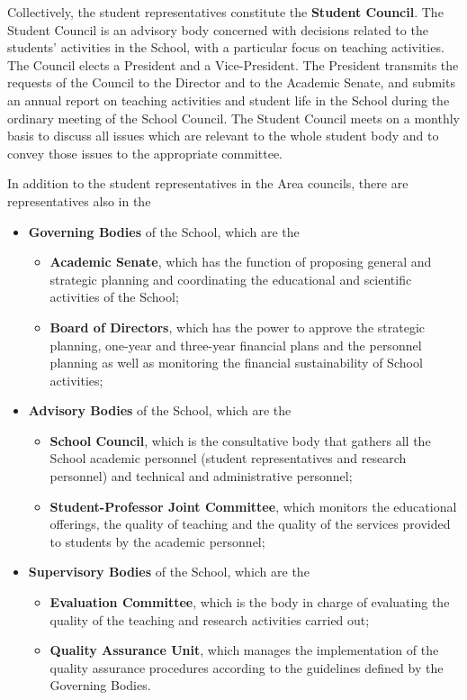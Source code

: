 \documentclass{sissavademecum}
\begin{document}
Collectively, the student representatives constitute the \textbf{Student Council}. The Student Council is an advisory body concerned with decisions related to the students' activities in the School, with a particular focus on teaching activities. The Council elects a President and a Vice-President. The President transmits the requests of the Council to the Director and to the Academic Senate, and submits an annual report on teaching activities and student life in the School during the ordinary meeting of the School Council. The Student Council meets on a monthly basis to discuss all issues which are relevant to the whole student body and to convey those issues to the appropriate committee.

In addition to the student representatives in the Area councils, there are representatives also in the
\begin{itemize}
    \item \textbf{Governing Bodies} of the School, which are the
    \begin{itemize}
        \item \textbf{Academic Senate}, which has the function of proposing general and strategic planning and coordinating the educational and scientific activities of the School;
        \item \textbf{Board of Directors}, which has the power to approve the strategic planning, one-year and three-year financial plans and the personnel planning as well as monitoring the financial sustainability of School activities;
    \end{itemize}
    \item \textbf{Advisory Bodies} of the School, which are the
    \begin{itemize}
        \item \textbf{School Council}, which is the consultative body that gathers all the School academic personnel (student representatives and research personnel) and technical and administrative personnel;
        \item \textbf{Student-Professor Joint Committee}, which monitors the educational offerings, the quality of teaching and the quality of the services provided to students by the academic personnel;
    \end{itemize}
    \item \textbf{Supervisory Bodies} of the School, which are the
    \begin{itemize}
        \item \textbf{Evaluation Committee}, which is the body in charge of evaluating the quality of the teaching and research activities carried out;
        \item \textbf{Quality Assurance Unit}, which manages the implementation of the quality assurance procedures according to the guidelines defined by the Governing Bodies.
    \end{itemize}
\end{itemize}
\end{document}
